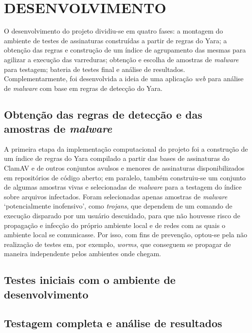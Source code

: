 \chapter{DESENVOLVIMENTO}
\label{c.Desenvolvimento}

O desenvolvimento do projeto dividiu-se em quatro fases: a montagem do ambiente de testes de assinaturas construídas
a partir de regras do Yara; a obtenção das regras e construção de um índice de agrupamento das mesmas para agilizar a
execução das varreduras; obtenção e escolha de amostras de \textit{malware} para testagem; bateria de testes final e
análise de resultados. Complementarmente, foi desenvolvida a ideia de uma aplicação \textit{web} para análise
de \textit{malware} com base em regras de detecção do Yara.

\section{Obtenção das regras de detecção e das amostras de \textit{malware}}
\label{s.obtregras}

A primeira etapa da implementação computacional do projeto foi a construção de um índice de regras do Yara compilado a partir das
bases de assinaturas do ClamAV e de outros conjuntos avulsos e menores de assinaturas disponibilizados em repositórios de código
aberto; em paralelo, também construiu-se um conjunto de algumas amostras vivas e selecionadas de \textit{malware} para a testagem
do índice sobre arquivos infectados. Foram selecionadas apenas amostras de \textit{malware} `potencialmente inofensivo', como
\textit{trojans}, que dependem de um comando de execução disparado por um usuário descuidado, para que não houvesse risco de
propagação e infecção do próprio ambiente local e de redes com as quais o ambiente local se comunicasse. Por isso, com fins de
prevenção, optou-se pela não realização de testes em, por exemplo, \textit{worms}, que conseguem se propagar de maneira independente
pelos ambientes onde chegam.


\section{Testes iniciais com o ambiente de desenvolvimento}
\label{s.testesiniciais}

\section{Testagem completa e análise de resultados}
\label{s.testefull}

